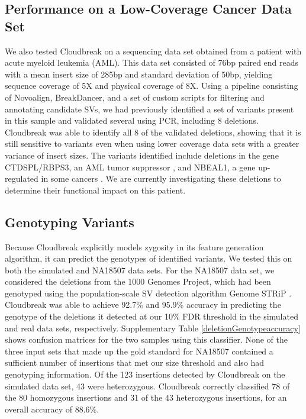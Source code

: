 \documentclass[11pt]{article}
\begin{document}
\subsection{Performance on a Low-Coverage Cancer Data Set}

We also tested Cloudbreak on a sequencing data set obtained from a patient with acute myeloid leukemia (AML). This data set consisted of 76bp paired end reads with a mean insert size of 285bp and standard deviation of 50bp, yielding sequence coverage of 5X and physical coverage of 8X. Using a pipeline consisting of Novoalign, BreakDancer, and a set of custom scripts for filtering and annotating candidate SVs, we had previously identified a set of variants present in this sample and validated several using PCR, including 8 deletions. Cloudbreak was able to identify all 8 of the validated deletions, showing that it is still sensitive to variants even when using lower coverage data sets with a greater variance of insert sizes. The variants identified include deletions in the gene CTDSPL/RBPS3, an AML tumor suppressor \autocite{Zheng:2012kk}, and NBEAL1, a gene up-regulated in some cancers \autocite{Chen:2004jo}. We are currently investigating these deletions to determine their functional impact on this patient. 

\subsection{Genotyping Variants}

Because Cloudbreak explicitly models zygosity in its feature generation algorithm, it can predict the genotypes of identified variants. We tested this on both the simulated and NA18507 data sets. For the NA18507 data set, we considered the deletions from the 1000 Genomes Project, which had been genotyped using the population-scale SV detection algorithm Genome STRiP \autocite{Handsaker:2011ki}. Cloudbreak was able to achieve 92.7\% and 95.9\% accuracy in predicting the genotype of the deletions it detected at our 10\% FDR threshold in the simulated and real data sets, respectively. Supplementary Table \ref{deletionGenotypeaccuracy} shows confusion matrices for the two samples using this classifier. None of the three input sets that made up the gold standard for NA18507 contained a sufficient number of insertions that met our size threshold and also had genotyping information. Of the 123 insertions detected by Cloudbreak on the simulated data set, 43 were heterozygous. Cloudbreak correctly classified 78 of the 80 homozygous insertions and 31 of the 43 heterozygous insertions, for an overall accuracy of 88.6\%.
\end{document}
